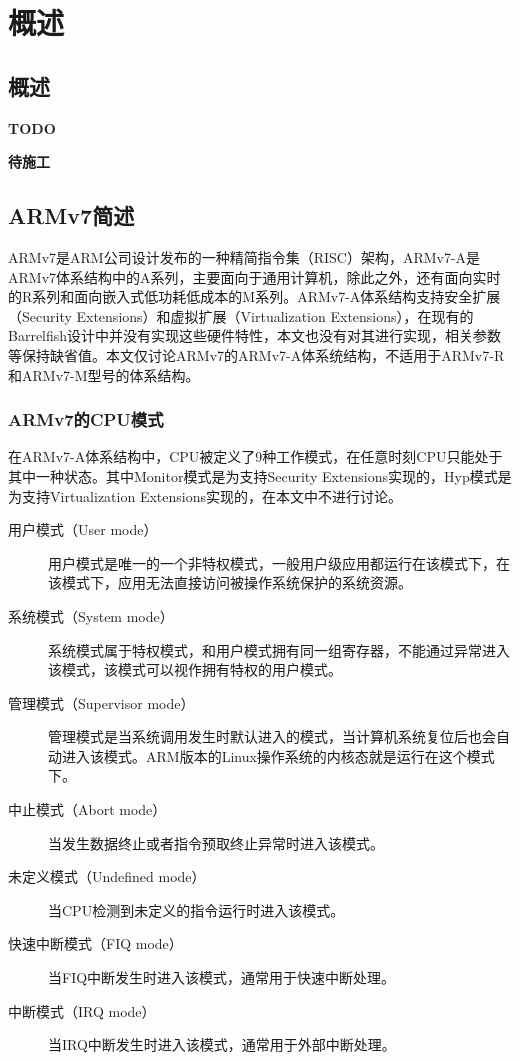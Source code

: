 \documentclass[a4paper, 12pt]{report}
\begin{document}
    \chapter{概述}
    
    \section{概述}
    
    \textbf{TODO}
    
    \textbf{待施工}
    
    \section{ARMv7简述}
    
    ARMv7是ARM公司设计发布的一种精简指令集（RISC）架构，ARMv7-A是ARMv7体系结构中的A系列，主要面向于通用计算机，除此之外，还有面向实时的R系列和面向嵌入式低功耗低成本的M系列。ARMv7-A体系结构支持安全扩展（Security Extensions）和虚拟扩展（Virtualization Extensions），在现有的Barrelfish设计中并没有实现这些硬件特性，本文也没有对其进行实现，相关参数等保持缺省值。本文仅讨论ARMv7的ARMv7-A体系统结构，不适用于ARMv7-R和ARMv7-M型号的体系结构。
    
    \subsection{ARMv7的CPU模式}
    
    在ARMv7-A体系结构中，CPU被定义了9种工作模式，在任意时刻CPU只能处于其中一种状态。其中Monitor模式是为支持Security Extensions实现的，Hyp模式是为支持Virtualization Extensions实现的，在本文中不进行讨论。
    
    \begin{description}
        \item[用户模式（User mode）] 用户模式是唯一的一个非特权模式，一般用户级应用都运行在该模式下，在该模式下，应用无法直接访问被操作系统保护的系统资源。
        \item[系统模式（System mode）] 系统模式属于特权模式，和用户模式拥有同一组寄存器，不能通过异常进入该模式，该模式可以视作拥有特权的用户模式。
        \item[管理模式（Supervisor mode）] 管理模式是当系统调用发生时默认进入的模式，当计算机系统复位后也会自动进入该模式。ARM版本的Linux操作系统的内核态就是运行在这个模式下。
        \item[中止模式（Abort mode）] 当发生数据终止或者指令预取终止异常时进入该模式。
        \item[未定义模式（Undefined mode）] 当CPU检测到未定义的指令运行时进入该模式。
        \item[快速中断模式（FIQ mode）] 当FIQ中断发生时进入该模式，通常用于快速中断处理。
        \item[中断模式（IRQ mode）] 当IRQ中断发生时进入该模式，通常用于外部中断处理。
    \end{description}
    
\end{document}
